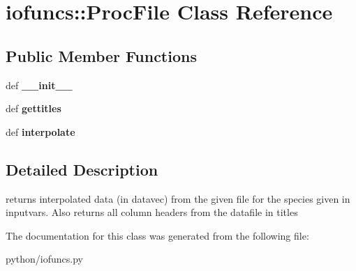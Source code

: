 \hypertarget{classiofuncs_1_1ProcFile}{
\section{iofuncs::ProcFile Class Reference}
\label{d3/d16/classiofuncs_1_1ProcFile}
}
\subsection*{Public Member Functions}
\begin{DoxyCompactItemize}
\item 
\hypertarget{classiofuncs_1_1ProcFile_aaf57101eb0b922217a240ca283fc5d9d}{
def {\bfseries \_\-\_\-init\_\-\_\-}}
\label{d3/d16/classiofuncs_1_1ProcFile_aaf57101eb0b922217a240ca283fc5d9d}

\item 
\hypertarget{classiofuncs_1_1ProcFile_a88f142260af3fd70b1b8613da471f858}{
def {\bfseries gettitles}}
\label{d3/d16/classiofuncs_1_1ProcFile_a88f142260af3fd70b1b8613da471f858}

\item 
\hypertarget{classiofuncs_1_1ProcFile_ae7f8d6213747a8d1e41b771ec71cd2be}{
def {\bfseries interpolate}}
\label{d3/d16/classiofuncs_1_1ProcFile_ae7f8d6213747a8d1e41b771ec71cd2be}

\end{DoxyCompactItemize}


\subsection{Detailed Description}
\begin{DoxyVerb}returns interpolated data (in datavec) from the given file 
for the species given in inputvars. Also returns all column headers
from the datafile in titles\end{DoxyVerb}
 

The documentation for this class was generated from the following file:\begin{DoxyCompactItemize}
\item 
python/iofuncs.py\end{DoxyCompactItemize}
